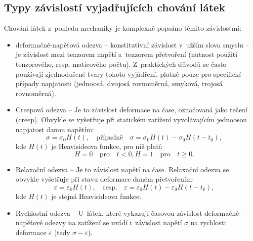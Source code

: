 \subsection{Typy závislostí vyjadřujících chování látek}
Chování látek z~pohledu mechaniky je komplexně popsáno těmito závislostmi: 
\begin{itemize}
	\item deformačně-napěťová odezva -- konstitutivní závislost v~užším slova smyslu -- je závislost mezi tenzorem napětí a~tenzorem přetvoření (nutnost použití tenzorového, resp. maticového počtu). Z~praktických důvodů se často používají zjednodušené tvary tohoto vyjádření, platné pouze pro specifické případy napjatosti (jednoosá, dvojosá rovnoměrná, smyková, trojosá rovnoměrná).
	\item Creepová odezva -- Je to závislost deformace na čase, označovaná jako tečení (creep). Obvykle se vyšetřuje při statickém zatížení vyvolávajícím jednoosou napjatost danou napětím:
	\begin{equation}
		\sigma = \sigma_0 H(t),
		\quad\text{případně}\quad
		\sigma = \sigma_0 H(t) - \sigma_0 H(t-t_0),
	\end{equation}
	kde $H(t)$ je Heavisideova funkce, pro níž platí:
	\begin{equation}
		H = 0 \quad\text{pro}\quad t < 0,
		H = 1 \quad\text{pro}\quad t \geq 0.
	\end{equation}
	\item Relaxační odezva -- Je to závislost napětí na čase. Relaxační odezva se obvykle vyšetřuje při stavu deformace daném přetvořením:
	\begin{equation}
		\varepsilon = \varepsilon_0 H(t),
		\quad\text{resp.}\quad
		\varepsilon = \varepsilon_0 H(t) - \varepsilon_0 H(t - t_0),
	\end{equation}
	kde $H(t)$ je stejná Heavisideova funkce.
	\item Rychlostní odezva -- U~látek, které vykazují časovou závislost deformačně-napěťové odezvy na zatížení se uvádí i~závislost napětí $\sigma$ na rychlosti deformace $\dot{\varepsilon}$ (tedy $\sigma-\dot{\varepsilon}$).
\end{itemize}




